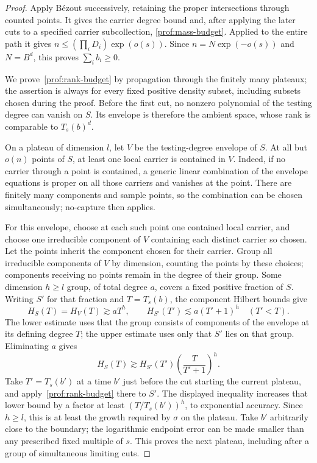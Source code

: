 \begin{proof}
Apply B\'ezout successively, retaining the proper intersections
through counted points.  It gives the carrier degree bound and,
after applying the later cuts to a specified carrier subcollection,
\eqref{prof:mass-budget}.  Applied to the entire path it gives
$n\le(\prod_iD_i)\exp(o(s))$.  Since $n=N\exp(-o(s))$ and $N=B^d$,
this proves $\sum_i b_i\ge0$.

We prove~\eqref{prof:rank-budget} by propagation through the finitely
many plateaux; the assertion is always for every fixed positive
density subset, including subsets chosen during the proof.  Before
the first cut, no nonzero polynomial of the testing degree can
vanish on $S$.  Its envelope is therefore the ambient space, whose
rank is comparable to $T_s(b)^d$.

On a plateau of dimension $l$, let $V$ be the testing-degree envelope
of $S$. At all but $o(n)$ points of $S$, at least one local carrier
is contained in $V$. Indeed, if no carrier through a point is
contained, a generic linear combination of the envelope equations
is proper on all those carriers and vanishes at the point. There
are finitely many components and sample points, so the combination
can be chosen simultaneously; no-capture then applies.

For this envelope, choose at each such point one contained local
carrier, and choose one irreducible component of $V$ containing each
distinct carrier so chosen. Let the points inherit the component
chosen for their carrier. Group all irreducible components of $V$ by
dimension, counting the points by these choices; components receiving
no points remain in the degree of their group. Some dimension $h\ge l$
group, of total degree $a$, covers a fixed positive fraction of $S$.
Writing $S'$ for that fraction and $T=T_s(b)$, the component Hilbert
bounds give
\[
 H_S(T)=H_V(T)\gtrsim aT^h,\qquad
 H_{S'}(T')\lesssim a(T'+1)^h\quad(T'<T).
\]
The lower estimate uses that the group consists of components of
the envelope at its defining degree $T$; the upper estimate uses
only that $S'$ lies on that group.  Eliminating $a$ gives
\[
 H_S(T)\gtrsim H_{S'}(T')
       \left(\frac{T}{T'+1}\right)^h.
\]
Take $T'=T_s(b')$ at a time $b'$ just before the cut starting the
current plateau, and apply~\eqref{prof:rank-budget} there to $S'$.
The displayed inequality increases that lower bound by a factor
at least $(T/T_s(b'))^h$, to exponential accuracy.  Since $h\ge l$,
this is at least the growth required by $\sigma$ on the plateau.
Take $b'$ arbitrarily close to the
boundary; the logarithmic endpoint error can be made smaller than
any prescribed fixed multiple of $s$.  This proves the next
plateau, including after a group of simultaneous limiting cuts.


\end{proof}
